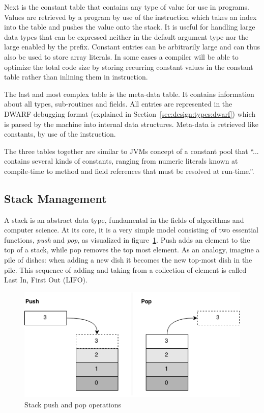 Next is the constant table that contains any type of value for use in
programs. Values are retrieved by a program by use of the 
instruction which takes an index into the table and pushes the value onto the
stack. It is useful for handling large data types that can be expressed neither
in the default  argument type nor the large  enabled by
the  prefix. Constant entries can be arbitrarily large and can thus
also be used to store array literals. In some cases a compiler will be able to
optimize the total code size by storing recurring constant values in the
constant table rather than inlining them in instruction.

The last and most complex table is the meta-data table. It contains information
about all types, sub-routines and fields. All entries are represented in the
DWARF debugging format (explained in Section~\ref{sec:design:types:dwarf}) which
is parsed by the machine into internal data structures. Meta-data is retrieved
like constants, by use of the  instruction.

The three tables together are similar to JVMs concept of a constant pool that
``... contains several kinds of constants, ranging from numeric literals known
at compile-time to method and field references that must be resolved at
run-time.''\cite[Section 2.5.5]{jvm-spec}.

\subsection{Stack Management}
\label{sec:design:stack-mgmt}

A stack is an abstract data type, fundamental in the fields of algorithms and
computer science. At its core, it is a very simple model consisting of two
essential functions, {\it push} and {\it pop}, as visualized in
figure~\ref{fig:stack}. Push adds an element to the top of a stack, while pop
removes the top most element. As an analogy, imagine a pile of dishes: when
adding a new dish it becomes the new top-most dish in the pile. This sequence of
adding and taking from a collection of element is called Last In, First Out
(LIFO).
\begin{figure}[h]
  \centering
  \includegraphics[scale=0.6]{images/stack.png}
  \caption{Stack push and pop operations}
  \label{fig:stack}
\end{figure}

